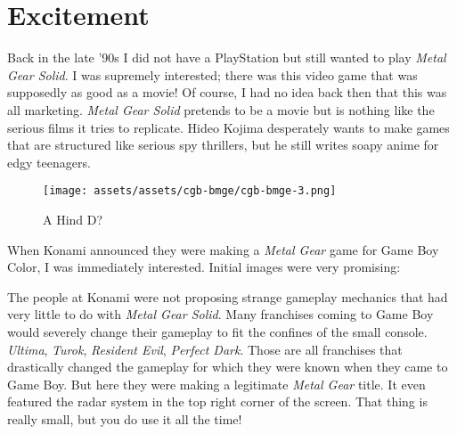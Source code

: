 \documentclass{book}
\let\oldcenter\center
\let\oldendcenter\endcenter
\renewenvironment{center}{\setlength\topsep{0pt}\oldcenter}{\oldendcenter}
\begin{document}
\FloatBarrier\needspace{10mm}\section*{Excitement}\nopagebreak[4]

Back in the late ’90s I did not have a PlayStation but still wanted to play \emph{Metal Gear Solid}. I was supremely interested; there was this video game that was supposedly as good as a movie! Of course, I had no idea back then that this was all marketing. \emph{Metal Gear Solid} pretends to be a movie but is nothing like the serious films it tries to replicate. Hideo Kojima desperately wants to make games that are structured like serious spy thrillers, but he still writes soapy anime for edgy teenagers.

\begin{figure}[hbt]
\vskip 10pt
\centering \texttt{[image: assets/assets/cgb-bmge/cgb-bmge-3.png]}\par\pagetwodescription A Hind D?
\vskip 6pt
\end{figure}

When Konami announced they were making a \emph{Metal Gear} game for Game Boy Color, I was immediately interested. Initial images were very promising:

\begin{center}
\vspace{8pt}
\quad\vspace{4pt}
\quad\vspace{4pt}
\end{center}

The people at Konami were not proposing strange gameplay mechanics that had very little to do with \emph{Metal Gear Solid}. Many franchises coming to Game Boy would severely change their gameplay to fit the confines of the small console. \emph{Ultima}, \emph{Turok}, \emph{Resident Evil}, \emph{Perfect Dark}. Those are all franchises that drastically changed the gameplay for which they were known when they came to Game Boy. But here they were making a legitimate \emph{Metal Gear} title. It even featured the radar system in the top right corner of the screen. That thing is really small, but you do use it all the time!
\end{document}
